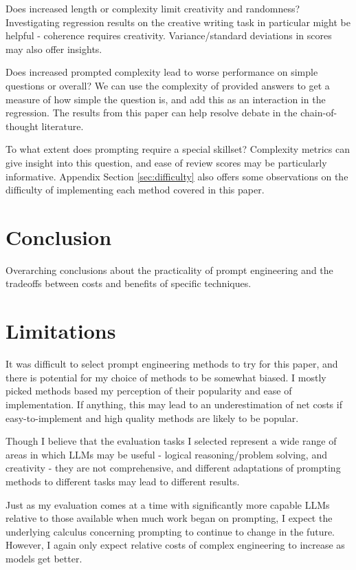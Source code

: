\documentclass[11pt]{article}
\begin{document}
Does increased length or complexity limit creativity and randomness? Investigating regression results on the creative writing task in particular might be helpful - coherence requires creativity. Variance/standard deviations in scores may also offer insights.

Does increased prompted complexity lead to worse performance on simple questions or overall? We can use the complexity of provided answers to get a measure of how simple the question is, and add this as an interaction in the regression. The results from this paper can help resolve debate in the chain-of-thought literature. \cite{fu_complexity-based_2023, shum_automatic_2023}

To what extent does prompting require a special skillset? Complexity metrics can give insight into this question, and ease of review scores may be particularly informative. Appendix Section \ref{sec:difficulty} also offers some observations on the difficulty of implementing each method covered in this paper.

\section*{Conclusion}

Overarching conclusions about the practicality of prompt engineering and the tradeoffs between costs and benefits of specific techniques.

\section*{Limitations}

It was difficult to select prompt engineering methods to try for this paper, and there is potential for my choice of methods to be somewhat biased. I mostly picked methods based my perception of their popularity and ease of implementation. If anything, this may lead to an underestimation of net costs if easy-to-implement and high quality methods are likely to be popular. 

Though I believe that the evaluation tasks I selected represent a wide range of areas in which LLMs may be useful - logical reasoning/problem solving, and creativity - they are not comprehensive, and different adaptations of prompting methods to different tasks may lead to different results.

Just as my evaluation comes at a time with significantly more capable LLMs relative to those available when much work began on prompting, I expect the underlying calculus concerning prompting to continue to change in the future. However, I again only expect relative costs of complex engineering to increase as models get better.
\end{document}
